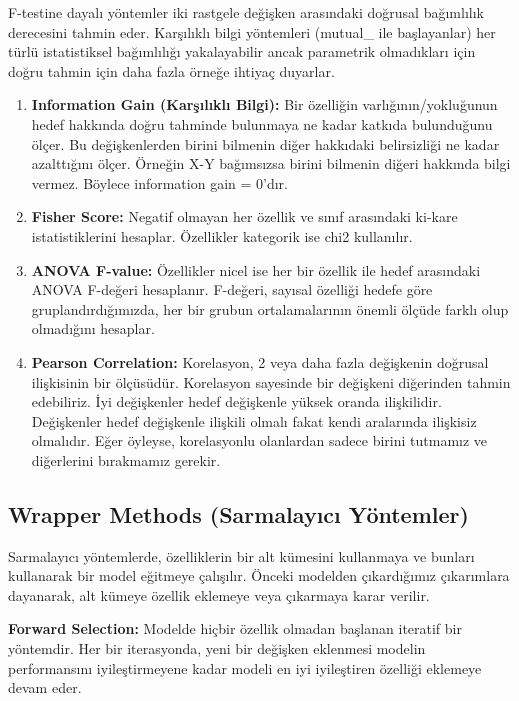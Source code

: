 F-testine dayalı yöntemler iki rastgele değişken arasındaki doğrusal bağımlılık derecesini tahmin eder. Karşılıklı bilgi yöntemleri (mutual\_ ile başlayanlar) her türlü istatistiksel bağımlılığı yakalayabilir ancak parametrik olmadıkları için doğru tahmin için daha fazla örneğe ihtiyaç duyarlar.

\begin{enumerate}
    \item \textbf{Information Gain (Karşılıklı Bilgi):} Bir özelliğin varlığının/yokluğunun hedef hakkında doğru tahminde bulunmaya ne kadar katkıda bulunduğunu ölçer. Bu değişkenlerden birini bilmenin diğer hakkıdaki belirsizliği ne kadar azalttığını ölçer. Örneğin X-Y bağımsızsa birini bilmenin diğeri hakkında bilgi vermez. Böylece information gain = 0'dır.
    \item \textbf{Fisher Score:} Negatif olmayan her özellik ve sınıf arasındaki ki-kare istatistiklerini hesaplar. Özellikler kategorik ise chi2 kullanılır.
    \item \textbf{ANOVA F-value:} Özellikler nicel ise her bir özellik ile hedef arasındaki ANOVA F-değeri hesaplanır. F-değeri, sayısal özelliği hedefe göre gruplandırdığımızda, her bir grubun ortalamalarının önemli ölçüde farklı olup olmadığını hesaplar.
    \item \textbf{Pearson Correlation:} Korelasyon, 2 veya daha fazla değişkenin doğrusal ilişkisinin bir ölçüsüdür. Korelasyon sayesinde bir değişkeni diğerinden tahmin edebiliriz. İyi değişkenler hedef değişkenle yüksek oranda ilişkilidir. Değişkenler hedef değişkenle ilişkili olmalı fakat kendi aralarında ilişkisiz olmalıdır. Eğer öyleyse, korelasyonlu olanlardan sadece birini tutmamız ve diğerlerini bırakmamız gerekir.
\end{enumerate}

\subsection{Wrapper Methods (Sarmalayıcı Yöntemler)}
Sarmalayıcı yöntemlerde, özelliklerin bir alt kümesini kullanmaya ve bunları kullanarak bir model eğitmeye çalışılır. Önceki modelden çıkardığımız çıkarımlara dayanarak, alt kümeye özellik eklemeye veya çıkarmaya karar verilir.

\textbf{Forward Selection:} Modelde hiçbir özellik olmadan başlanan iteratif bir yöntemdir. Her bir iterasyonda, yeni bir değişken eklenmesi modelin performansını iyileştirmeyene kadar modeli en iyi iyileştiren özelliği eklemeye devam eder.

